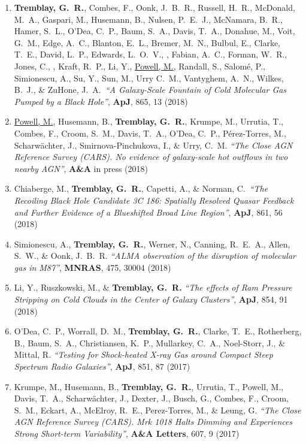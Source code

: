 \documentclass[11pt]{article}
\begin{document}
\begin{enumerate}
\item \textbf{Tremblay, G.~R.}, Combes, F., Oonk, J.~B.~R., Russell, H.~R., McDonald, M.~A.,
Gaspari, M., Husemann, B., Nulsen, P.~E.~J., McNamara, B.~R., Hamer, S.~L., O'Dea, C.~P.,
Baum, S.~A., Davis, T.~A., Donahue, M., Voit, G.~M., Edge, A.~C., Blanton, E.~L.,
Bremer, M.~N., Bulbul, E., Clarke, T.~E., David, L.~P., Edwards, L.~O.~V., , Fabian, A.~C., Forman, W.~R., Jones, C., , Kraft, R.~P., Li, Y., \uline{Powell, M.},
Randall, S., Salom\'{e}, P., Simionescu, A., Su, Y., Sun, M., Urry C.~M., Vantyghem, A.~N.,
Wilkes, B.~J., \& ZuHone, J.~A.~\textit{``A Galaxy-Scale Fountain of Cold Molecular Gas Pumped by a Black Hole''}, \textbf{ApJ}, 865, 13 (2018)



\item \uline{Powell, M.}, Husemann, B., \textbf{Tremblay, G.~R.}, Krumpe, M.,
Urrutia, T., Combes, F., Croom, S.~M., Davis, T.~A., O'Dea, C.~P., P\'{e}rez-Torres,
M., Scharw\"{a}chter, J., Smirnova-Pinchukova, I., \& Urry, C.~M. \textit{``The Close AGN Reference Survey (CARS). No evidence of galaxy-scale hot outflows in two nearby AGN''}, \textbf{A\&A} in press (2018)


\item Chiaberge, M., \textbf{Tremblay, G.~R.}, Capetti, A., \& Norman, C.~\textit{``The Recoiling Black Hole Candidate 3C 186: Spatially Resolved Quasar Feedback and Further Evidence of a Blueshifted Broad Line Region''},
\textbf{ApJ}, 861, 56 (2018)


\item Simionescu, A., \textbf{Tremblay, G.~R.}, Werner, N., Canning, R.~E.~A., Allen, S.~W., \& Oonk, J.~B.~R.
\textit{``ALMA observation of the disruption of
molecular gas in M87''}, \textbf{MNRAS}, 475, 30004 (2018)


\item Li, Y., Ruszkowski, M., \& \textbf{Tremblay, G.~R.} \textit{``The effects of Ram Pressure Stripping on Cold Clouds in the Center of Galaxy Clusters''}, \textbf{ApJ}, 854, 91 (2018)


\item O'Dea, C.~P., Worrall, D.~M., \textbf{Tremblay, G.~R.}, Clarke, T.~E., Rotherberg, B., Baum, S.~A.,
Christiansen, K.~P., Mullarkey, C.~A., Noel-Storr,
J., \& Mittal, R. \textit{``Testing for Shock-heated X-ray Gas around Compact Steep Spectrum Radio Galaxies''}, \textbf{ApJ}, 851, 87 (2017)


\item Krumpe, M., Husemann, B., \textbf{Tremblay, G.~R.}, Urrutia, T., Powell, M., Davis, T.~A., Scharw\"{a}chter, J., Dexter, J., Busch, G., Combes, F., Croom, S.~M.,
Eckart, A., McElroy, R.~E., Perez-Torres, M., \& Leung, G. \textit{``The Close AGN Reference Survey (CARS). Mrk 1018 Halts Dimming and Experiences Strong Short-term Variability''}, \textbf{A\&A Letters}, 607, 9 (2017)




\end{enumerate}
\end{document}
